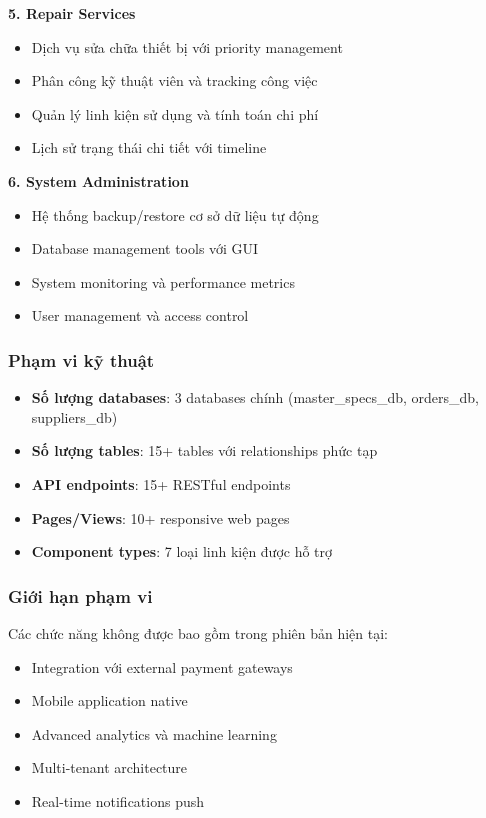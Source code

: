 \documentclass[12pt,a4paper]{article}
\begin{document}
\textbf{5. Repair Services}
\begin{itemize}
    \item Dịch vụ sửa chữa thiết bị với priority management
    \item Phân công kỹ thuật viên và tracking công việc
    \item Quản lý linh kiện sử dụng và tính toán chi phí
    \item Lịch sử trạng thái chi tiết với timeline
\end{itemize}

\textbf{6. System Administration}
\begin{itemize}
    \item Hệ thống backup/restore cơ sở dữ liệu tự động
    \item Database management tools với GUI
    \item System monitoring và performance metrics
    \item User management và access control
\end{itemize}

\subsubsection{Phạm vi kỹ thuật}
\begin{itemize}
    \item \textbf{Số lượng databases}: 3 databases chính (master\_specs\_db, orders\_db, suppliers\_db)
    \item \textbf{Số lượng tables}: 15+ tables với relationships phức tạp
    \item \textbf{API endpoints}: 15+ RESTful endpoints
    \item \textbf{Pages/Views}: 10+ responsive web pages
    \item \textbf{Component types}: 7 loại linh kiện được hỗ trợ
\end{itemize}

\subsubsection{Giới hạn phạm vi}
Các chức năng không được bao gồm trong phiên bản hiện tại:
\begin{itemize}
    \item Integration với external payment gateways
    \item Mobile application native
    \item Advanced analytics và machine learning
    \item Multi-tenant architecture
    \item Real-time notifications push
\end{itemize}
\end{document}
